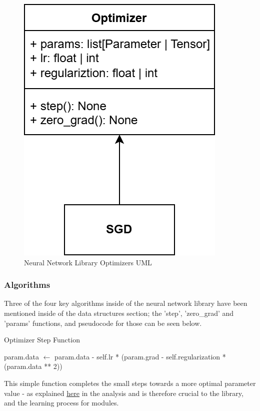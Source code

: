 \documentclass{article}
\newcommand{\myhy}[2]{\hyperref[#1]{\color{black}\setulcolor{black}\ul{#2}}}
\begin{document}
    \begin{figure}[h]
        \centering
        \includegraphics[scale=0.22]{NN-Optimizers-Design-UML.drawio.png}
        \caption{Neural Network Library Optimizers UML}
    \end{figure}

    \pagebreak
    \subsubsection{Algorithms}
    Three of the four key algorithms inside of the neural network library have been mentioned inside of the data structures section; the 'step',
    'zero_grad' and 'params' functions, and pseudocode for those can be seen below.

    \begin{algorithm} 
        \caption{Optimizer Step Function}
        \begin{algorithmic}
                \State param.data $\gets$ param.data - self.lr * (param.grad - self.regularization * (param.data ** 2))
            \EndFor
        \EndFunction
        \end{algorithmic}
    \end{algorithm}

    This simple function completes the small steps towards a more optimal parameter value - as explained \myhy{Analysis-GradientDescent}{here} in the analysis and
    is therefore crucial to the library, and the learning process for modules.
\end{document}
